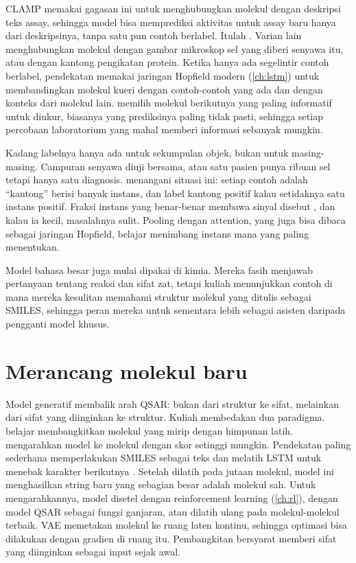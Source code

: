 CLAMP \citep{seidl2023} memakai gagasan ini untuk menghubungkan molekul dengan deskripsi teks assay, sehingga model bisa
memprediksi aktivitas untuk assay baru hanya dari deskripsinya, tanpa satu pun contoh berlabel. Itulah
. Varian lain menghubungkan molekul dengan gambar mikroskop sel yang diberi senyawa itu, atau
dengan kantong pengikatan protein. Ketika hanya ada segelintir contoh berlabel, pendekatan  memakai jaringan
Hopfield modern (\cref{ch:lstm}) untuk membandingkan molekul kueri dengan contoh-contoh yang ada dan dengan konteks dari
molekul lain.  memilih molekul berikutnya yang paling informatif untuk diukur, biasanya yang
prediksinya paling tidak pasti, sehingga setiap percobaan laboratorium yang mahal memberi informasi sebanyak mungkin.

Kadang labelnya hanya ada untuk sekumpulan objek, bukan untuk masing-masing. Campuran senyawa diuji bersama, atau satu
pasien punya ribuan sel tetapi hanya satu diagnosis.  menangani situasi ini: setiap contoh
adalah ``kantong'' berisi banyak instans, dan label kantong positif kalau setidaknya satu instans positif. Fraksi instans
yang benar-benar membawa sinyal disebut , dan kalau ia kecil, masalahnya sulit. Pooling dengan attention,
yang juga bisa dibaca sebagai jaringan Hopfield, belajar menimbang instans mana yang paling menentukan.

Model bahasa besar juga mulai dipakai di kimia. Mereka fasih menjawab pertanyaan tentang reaksi dan sifat zat, tetapi kuliah
menunjukkan contoh di mana mereka kesulitan memahami struktur molekul yang ditulis sebagai SMILES, sehingga peran mereka
untuk sementara lebih sebagai asisten daripada pengganti model khusus.

\section{Merancang molekul baru}

Model generatif membalik arah QSAR: bukan dari struktur ke sifat, melainkan dari sifat yang diinginkan ke struktur. Kuliah
membedakan dua paradigma.  belajar membangkitkan molekul yang mirip dengan himpunan latih.
 mengarahkan model ke molekul dengan skor setinggi mungkin. Pendekatan paling sederhana
memperlakukan SMILES sebagai teks dan melatih LSTM untuk menebak karakter berikutnya \citep{segler2018gen}. Setelah dilatih
pada jutaan molekul, model ini menghasilkan string baru yang sebagian besar adalah molekul sah. Untuk mengarahkannya, model
disetel dengan reinforcement learning (\cref{ch:rl}), dengan model QSAR sebagai fungsi ganjaran, atau dilatih ulang pada
molekul-molekul terbaik. VAE \citep{gomezbombarelli2018} memetakan molekul ke ruang laten kontinu, sehingga optimasi bisa
dilakukan dengan gradien di ruang itu. Pembangkitan bersyarat memberi sifat yang diinginkan sebagai input sejak awal.

